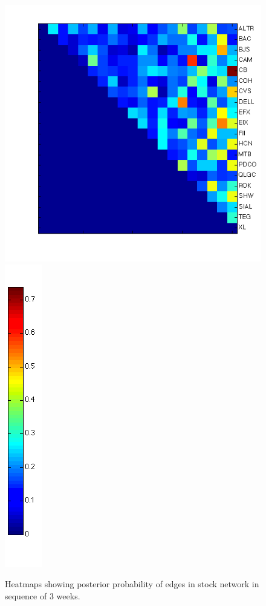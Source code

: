 \documentclass{article}
\begin{document}
\begin{figure}[!tbp]
  \includegraphics[height=0.18\textheight]{fig/stocks3.png}
  \hspace{4mm}
  \includegraphics[height=0.18\textheight]{fig/colorbar.png}
  \caption{Heatmaps showing posterior probability of edges in stock network in sequence of 3 weeks.}
  \label{fig:stockResults}
\end{figure}
\end{document}
